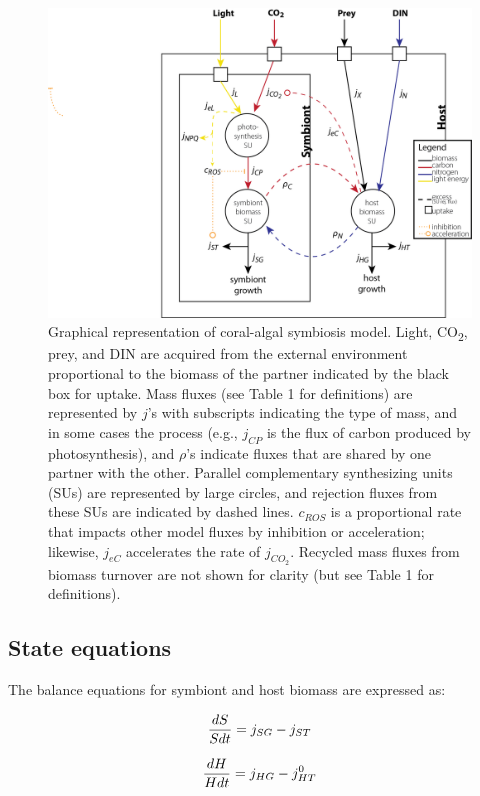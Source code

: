 \documentclass[]{elsarticle} %
\makeatletter
\def\maxwidth{\ifdim\Gin@nat@width>\linewidth\linewidth
\else\Gin@nat@width\fi}
\let\Oldincludegraphics\includegraphics
\renewcommand{\includegraphics}[1]{\Oldincludegraphics[width=\maxwidth]{#1}}
\makeatother
\begin{document}
\begin{figure}[htbp]
\centering
\includegraphics{../img/Fig1.png}
\caption{Graphical representation of coral-algal symbiosis model. Light,
CO\textsubscript{2}, prey, and DIN are acquired from the external
environment proportional to the biomass of the partner indicated by the
black box for uptake. Mass fluxes (see Table 1 for definitions) are
represented by \(j\)'s with subscripts indicating the type of mass, and
in some cases the process (e.g., \(j_{CP}\) is the flux of carbon
produced by photosynthesis), and \(\rho\)'s indicate fluxes that are
shared by one partner with the other. Parallel complementary
synthesizing units (SUs) are represented by large circles, and rejection
fluxes from these SUs are indicated by dashed lines. \(c_{ROS}\) is a
proportional rate that impacts other model fluxes by inhibition or
acceleration; likewise, \(j_{eC}\) accelerates the rate of \(j_{CO_2}\).
Recycled mass fluxes from biomass turnover are not shown for clarity
(but see Table 1 for definitions).}
\end{figure}

\subsection{State equations}\label{state-equations}

The balance equations for symbiont and host biomass are expressed as:

\begin{equation} {dS \over Sdt} = j_{SG} - j_{ST} \end{equation}

\begin{equation} {dH \over Hdt} = j_{HG} - j_{HT}^0 \end{equation}
\end{document}
